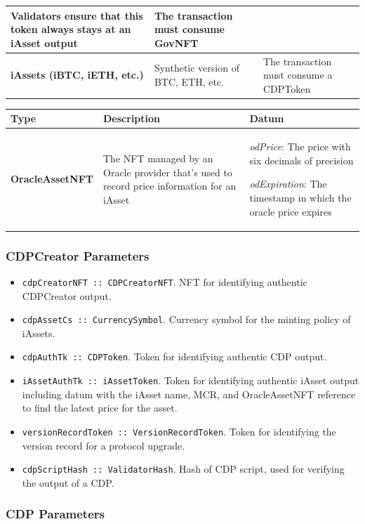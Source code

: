 \documentclass{article}
\begin{document}
\begin{sloppypar}
\begin{tabularx}{\linewidth}{l|L|L}
Validators ensure that this token always stays at an iAsset output
&
The transaction must consume GovNFT
\tabularnewline
\midrule
\textbf{iAssets (iBTC, iETH, etc.)} & Synthetic version of BTC, ETH,
etc. & The transaction must consume a CDPToken
\tabularnewline
\bottomrule
\end{tabularx}

\begin{tabularx}{\linewidth}{l|L|L}
\caption{CDP token inputs}
\tabularnewline
\toprule
\textbf{Type} & \textbf{Description} & \textbf{Datum}
\tabularnewline
\midrule
\endhead
\textbf{OracleAssetNFT}
&
The NFT managed by an Oracle provider that's used to record price
information for an iAsset
&
\emph{odPrice}: The price with six decimals of precision

\emph{odExpiration}: The timestamp in which the oracle price
expires
\tabularnewline
\bottomrule
\end{tabularx}

\hypertarget{cdpcreator-parameters}{%
\subsubsection{CDPCreator Parameters}\label{cdpcreator-parameters}}

\begin{itemize}
\item
  \texttt{cdpCreatorNFT~::~CDPCreatorNFT}. NFT for identifying authentic
  CDPCreator output.
\item
  \texttt{cdpAssetCs~::~CurrencySymbol}. Currency symbol for the minting
  policy of iAssets.
\item
  \texttt{cdpAuthTk~::~CDPToken}. Token for identifying authentic CDP
  output.
\item
  \texttt{iAssetAuthTk~::~iAssetToken}. Token for identifying authentic
  iAsset output including datum with the iAsset name, MCR, and
  OracleAssetNFT reference to find the latest price for the asset.
\item
  \texttt{versionRecordToken~::~VersionRecordToken}. Token for
  identifying the version record for a protocol upgrade.
\item
  \texttt{cdpScriptHash~::~ValidatorHash}. Hash of CDP script, used for
  verifying the output of a CDP.
\end{itemize}

\hypertarget{cdp-parameters}{%
\subsubsection{CDP Parameters}\label{cdp-parameters}}


\end{sloppypar}
\end{document}
